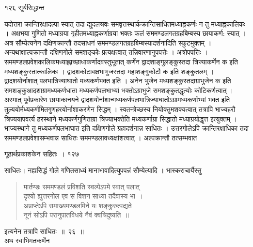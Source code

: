 \documentclass[11pt, openany]{book}
\begin{document}
\newpage




\noindent १२६ \hspace{4cm} सूर्यसिद्धान्त 
\vspace{1cm}

\begin{sloppypar}
 यदोत्तरा क्रान्तिरक्षादल्पा स्यात् तदा द्युदलश्रवः समवृत्तस्थार्कक्रान्तिसाधितमध्याह्नकर्णः न तु मध्याह्नकालिकः । अक्षभया गुणितो मध्याग्रया गृहीतमध्याह्नकर्णाग्रया भक्तः फलं सममण्डलगतग्रहबिम्बस्य छायाकर्ण: स्यात् । अत्र सौम्येत्यनेन दक्षिणक्रान्तौ तदसाधनं सममण्डलगतग्रहबिम्बस्यादर्शनादिति स्फुटमुक्तम् । अन्यथाक्षाल्पक्रान्तौ दक्षिणगोले समशङ्कोः प्रत्यक्षत्वात् तन्निवारणानुपपत्तेः । अत्रोपपत्तिः । सममण्डलप्रवेशकालिकमध्याह्नाच्छाधाकर्णादवस्तुभूतात् कर्णेन द्वादशाङ्गुलङ्कुस्तदा त्रिज्याकर्णेन क इति मध्यशङ्कुस्तात्कालिकः । द्वादशकोटावक्षभाभुजस्तदा महाशङ्गुकोटौ क इति शङ्कुतलम् । द्वादशयोर्नाशात् पलभात्रिज्याघातो मध्यकर्णभक्त इति । अनेन भुजेन मध्यशङ्कुस्तदाग्राभुजेन क इति समशङ्कुआदशाग्रामध्यकर्णधाता मध्यकर्णपलभाभ्यां भक्तोऽग्राभुजे समशङ्कुतद्धृत्योः कोटिकर्णत्वात् । अस्मात् पूर्वप्रकारेण छायाकानयने द्वादशयोर्नाशान्मध्यकर्णपलभात्रिज्याघातोऽग्रामध्यकर्णाभ्यां भक्त इति तुल्ययोर्मध्यकर्णमितगुणहरयोर्नाशाकरणेन सिद्धम् । स्वतन्त्रेच्छस्य नियोक्तुमशक्यत्वात् तत्रापि भाज्यहरौ त्रिज्ययापवर्त्य हरस्थाने मध्यकर्णगुणिताग्रा त्रिज्याभक्तेति मध्यकर्णाग्रा सिद्धातो मध्याग्रयोद्धृत्त इत्युक्तम् । भाज्यस्थाने तु मध्यकर्णपलभाघात इति दक्षिणगोले ग्रहादर्शनान्न साधितः । उत्तरगोलेऽपि क्रान्तिरक्षाधिका तदा सममण्डलप्रवेशासम्भवान्न साधितः सममण्डलावध्यक्षांशत्वात् । अल्पक्रान्तौ तत्सम्भवात
\end{sloppypar}



\newpage

\hspace{3cm} गूढार्थप्रकाशकेन सहितः~। \hfill १२७
\vspace{1cm}


\noindent साधितः। नह्यसिद्धं गोले गणितसाध्यं मानाभावादित्युपपन्नं
सौम्येत्यादि । भास्कराचार्यैस्तु\textendash


\begin{quote}
 {\qt मार्तण्डः सममण्डलं प्रविशति स्वल्पेऽपमे स्वात् पलात्\\
 दृश्यो ह्युत्तरगोल एव स विशन साध्या तदैवास्य भा~।\\
 अप्राप्तेऽपि समाख्यमण्डलमिने यः शङ्कुरुत्पद्यते\\
 नूनं सोऽपि परानुपातविधये नैवं क्वचिदुष्यति~॥}
 \end{quote}
 इत्यनेन तत्रापि साधितः~॥~२६~॥\\
 \noindent अथ स्वाभिमतकर्णेन
 
\end{document}
